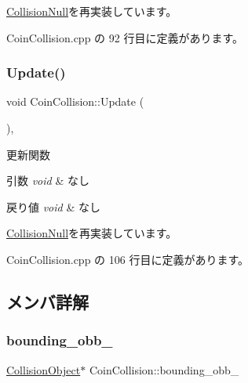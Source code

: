 \mbox{\hyperlink{class_collision_null_aafac3fdab43845465fd1e0198c423ccf}{Collision\+Null}}を再実装しています。



 Coin\+Collision.\+cpp の 92 行目に定義があります。

\mbox{\label{class_coin_collision_a981fd9b1b8c688a757a456a56d80501b}} 
\subsubsection{\texorpdfstring{Update()}{Update()}}
{\footnotesize\ttfamily void Coin\+Collision\+::\+Update (\begin{DoxyParamCaption}{ }\end{DoxyParamCaption})\hspace{0.3cm}{\ttfamily [override]}, {\ttfamily [virtual]}}



更新関数 


\begin{DoxyParams}{引数}
{\em void} & なし \\
\hline
\end{DoxyParams}

\begin{DoxyRetVals}{戻り値}
{\em void} & なし \\
\hline
\end{DoxyRetVals}


\mbox{\hyperlink{class_collision_null_ad6ac0e9b06fcb4e3d19a5c3c1cadfe7e}{Collision\+Null}}を再実装しています。



 Coin\+Collision.\+cpp の 106 行目に定義があります。



\subsection{メンバ詳解}
\mbox{\label{class_coin_collision_ac604781e9ab6194c06bf9ca7f426bd95}} 
\subsubsection{\texorpdfstring{bounding\+\_\+obb\+\_\+}{bounding\_obb\_}}
{\footnotesize\ttfamily \mbox{\hyperlink{class_collision_object}{Collision\+Object}}$\ast$ Coin\+Collision\+::bounding\+\_\+obb\+\_\+\hspace{0.3cm}{\ttfamily [private]}}



